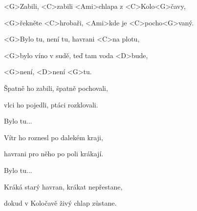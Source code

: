 

\zs
<G>Zabili, <C>zabili <Ami>chlapa z <C>Kolo<G>čavy,

<G>řekněte <C>hrobaři, <Ami>kde je <C>pocho<G>vaný.
\ks

\zr
<G>Bylo tu, není tu, havrani <C>na plotu,

<G>bylo víno v sudě, teď tam voda <D>bude,

<G>není, <D>není <G>tu.
\kr

\zs
Špatně ho zabili, špatně pochovali,

vlci ho pojedli, ptáci rozklovali.
\ks

\zr
Bylo tu...
\kr

\zs
Vítr ho roznesl po dalekém kraji,

havrani pro něho po poli krákají.
\ks

\zr
Bylo tu...
\kr

\zs
Kráká starý havran, krákat nepřestane,

dokud v Koločavě živý chlap zůstane.
\ks

\kp
